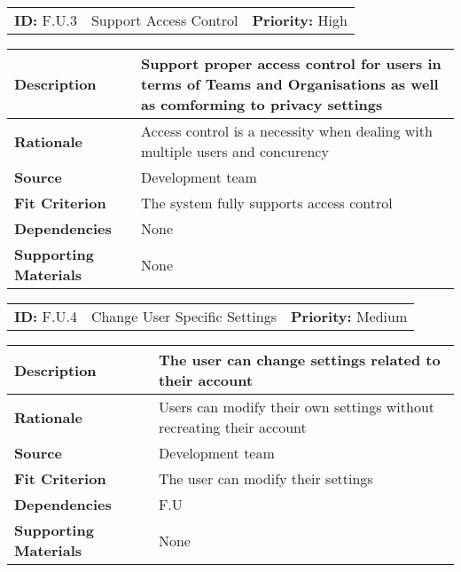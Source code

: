 \begin{table}[H]
    \begin{tabularx}{\textwidth}{| l | X | l |}
        \hline
        \textbf{ID:} F.U.3 & Support Access Control & \textbf{Priority:} High \\
    \end{tabularx}
    \begin{tabularx}{\textwidth}{| l | X |}
        \hline
        \textbf{Description} & Support proper access control for users in terms of Teams and Organisations as well as comforming to privacy settings\\ \hline
        \textbf{Rationale} & Access control is a necessity when dealing with multiple users and concurency \\ \hline
        \textbf{Source} & Development team\\ \hline
        \textbf{Fit Criterion} & The system fully supports access control \\ \hline
        \textbf{Dependencies} & None \\ \hline
        \textbf{Supporting Materials} & None \\ \hline
    \end{tabularx}
\end{table}

\begin{table}[H]
    \begin{tabularx}{\textwidth}{| l | X | l |}
        \hline
        \textbf{ID:} F.U.4 & Change User Specific Settings & \textbf{Priority:} Medium \\
    \end{tabularx}
    \begin{tabularx}{\textwidth}{| l | X |}
        \hline
        \textbf{Description} & The user can change settings related to their account\\ \hline
        \textbf{Rationale} & Users can modify their own settings without recreating their account\\ \hline
        \textbf{Source} &  Development team\\ \hline
        \textbf{Fit Criterion} & The user can modify their settings \\ \hline
        \textbf{Dependencies} & F.U \\ \hline
        \textbf{Supporting Materials} & None \\ \hline
    \end{tabularx}
\end{table}

